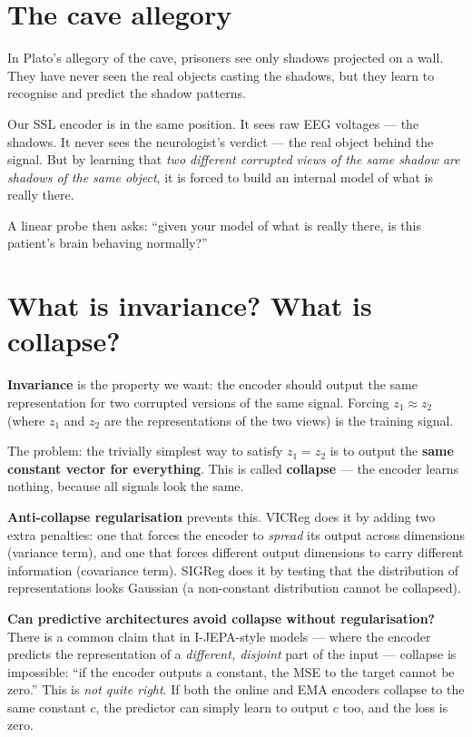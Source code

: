 \documentclass[11pt,a4paper]{article}
\begin{document}
\section*{The cave allegory}

In Plato's allegory of the cave, prisoners see only shadows projected on a
wall.  They have never seen the real objects casting the shadows, but they
learn to recognise and predict the shadow patterns.

Our SSL encoder is in the same position.  It sees raw EEG voltages — the
shadows.  It never sees the neurologist's verdict — the real object behind
the signal.  But by learning that \emph{two different corrupted views of the
same shadow are shadows of the same object}, it is forced to build an
internal model of what is really there.

A linear probe then asks: ``given your model of what is really there, is
this patient's brain behaving normally?''

\section*{What is invariance? What is collapse?}

\textbf{Invariance} is the property we want: the encoder should output the
same representation for two corrupted versions of the same signal.
Forcing $z_1 \approx z_2$ (where $z_1$ and $z_2$ are the representations
of the two views) is the training signal.

The problem: the trivially simplest way to satisfy $z_1 = z_2$ is to output
the \textbf{same constant vector for everything}.  This is called
\textbf{collapse} — the encoder learns nothing, because all signals look
the same.

\textbf{Anti-collapse regularisation} prevents this.  VICReg does it by
adding two extra penalties: one that forces the encoder to \emph{spread}
its output across dimensions (variance term), and one that forces different
output dimensions to carry different information (covariance term).
SIGReg does it by testing that the distribution of representations looks
Gaussian (a non-constant distribution cannot be collapsed).

\textbf{Can predictive architectures avoid collapse without regularisation?}
There is a common claim that in I-JEPA-style models --- where the encoder
predicts the representation of a \emph{different, disjoint} part of the
input --- collapse is impossible: ``if the encoder outputs a constant, the
MSE to the target cannot be zero.''  This is \emph{not quite right}.  If
both the online and EMA encoders collapse to the same constant $c$, the
predictor can simply learn to output $c$ too, and the loss is zero.
\end{document}
